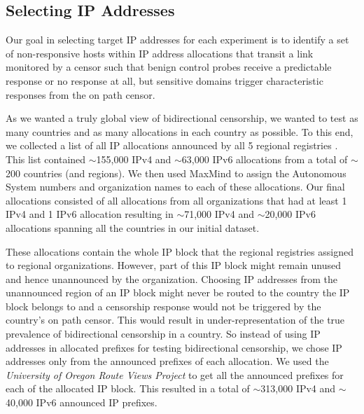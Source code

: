 
\subsection{Selecting IP Addresses}
\label{subsec:selecting-ips}
Our goal in selecting target IP addresses for each experiment is to identify a set of
non-responsive hosts within IP address allocations that transit a link monitored
by a censor such that benign control probes receive a predictable response or no
response at all, but sensitive domains trigger characteristic responses from the
on path censor.

As we wanted a truly global view of bidirectional censorship, we wanted to test as many countries and as many allocations in each country as possible. To this end, we collected a list of all IP allocations announced by all 5 regional registries \cite{herrbisc56:online}. This list contained $\sim$155,000 IPv4 and $\sim$63,000 IPv6 allocations from a total of $\sim$200 countries (and regions). We then used MaxMind \cite{IPGeoloc87:online} to assign the Autonomous System numbers and organization names to each of these allocations. Our final allocations consisted of all allocations from all organizations that had at least 1 IPv4 and 1 IPv6 allocation resulting in 
$\sim$71,000 IPv4 and $\sim$20,000 IPv6 allocations spanning all the countries in our initial dataset.   

These allocations contain the whole IP block that the regional registries assigned to regional organizations. However, part of this IP block might remain unused and hence unannounced by the organization. Choosing IP addresses from the unannounced region of an IP block might never be routed to the country the IP block belongs to and a censorship response would not be triggered by the country's on path censor. This would result in under-representation of the true prevalence of bidirectional censorship in a country. So instead of using IP addresses in allocated prefixes for testing bidirectional censorship, we chose IP addresses only from the announced prefixes of each allocation. We used the \textit{University of Oregon Route Views Project} \cite{RouteVie20:online}
to get all the announced prefixes for each of the allocated IP block. This resulted in a total of 
$\sim$313,000 IPv4 and $\sim$40,000 IPv6 announced IP prefixes. 

